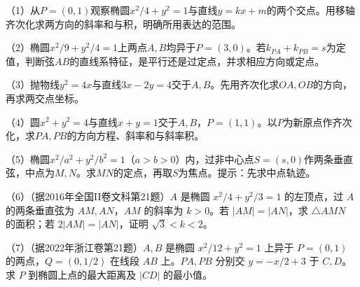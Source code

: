\begingroup
\setlength{\parskip}{2pt}
\begin{exercise}
\mbox{}\par\nobreak

\begin{samepage}
（1）从\(P=(0,1)\)观察椭圆\(x^2/4+y^2=1\)与直线\(y=kx+m\)的两个交点。用移轴齐次化求两方向的斜率和与积，明确所用表达的范围。
\par
\end{samepage}

\begin{samepage}
（2）椭圆\(x^2/9+y^2/4=1\)上两点\(A,B\)均异于\(P=(3,0)\)。若\(k_{PA}+k_{PB}=s\)为定值，判断弦\(AB\)的直线系特征，是平行还是过定点，并求相应方向或定点。
\par
\end{samepage}

\begin{samepage}
（3）抛物线\(y^2=4x\)与直线\(3x-2y=4\)交于\(A,B\)。先用齐次化求\(OA,OB\)的方向，再求两交点坐标。
\par
\end{samepage}

\begin{samepage}
（4）圆\(x^2+y^2=4\)与直线\(x+y=1\)交于\(A,B\)，\(P=(1,1)\)。以\(P\)为新原点作齐次化，求\(PA,PB\)的方向方程、斜率和与斜率积。
\par
\end{samepage}


\begin{samepage}
（5）椭圆\(x^2/a^2+y^2/b^2=1\)（\(a>b>0\)）内，过非中心点\(S=(s,0)\)作两条垂直弦，中点为\(M,N\)。求\(MN\)的定点，再取\(S\)为焦点。提示：先求中点轨迹。
\par
\end{samepage}
\begin{samepage}
（6）（据2016年全国II卷文科第21题）\(A\) 是椭圆 \(x^2/4+y^2/3=1\) 的左顶点，过 \(A\) 的两条垂直弦为 \(AM,AN\)，\(AM\) 的斜率为 \(k>0\)。若 \(|AM|=|AN|\)，求 \(\triangle AMN\) 的面积；若 \(2|AM|=|AN|\)，证明 \(\sqrt3<k<2\)。
\par\end{samepage}
\begin{samepage}
（7）（据2022年浙江卷第21题）\(A,B\) 是椭圆 \(x^2/12+y^2=1\) 上异于 \(P=(0,1)\) 的两点，\(Q=(0,1/2)\) 在线段 \(AB\) 上。\(PA,PB\) 分别交 \(y=-x/2+3\) 于 \(C,D\)。求 \(P\) 到椭圆上点的最大距离及 \(|CD|\) 的最小值。
\par\end{samepage}
\end{exercise}
\endgroup

